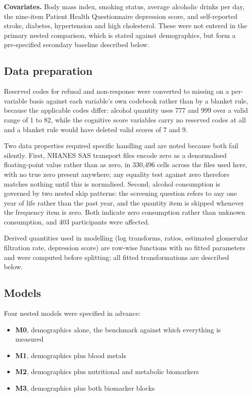 \documentclass[12pt]{article}
\begin{document}
\textbf{Covariates.} Body mass index, smoking status, average alcoholic drinks per day, the nine-item Patient Health Questionnaire depression score, and self-reported stroke, diabetes, hypertension and high cholesterol. These were not entered in the primary nested comparison, which is stated against demographics, but form a pre-specified secondary baseline described below.

\subsection*{Data preparation}

Reserved codes for refusal and non-response were converted to missing on a per-variable basis against each variable's own codebook rather than by a blanket rule, because the applicable codes differ: alcohol quantity uses 777 and 999 over a valid range of 1 to 82, while the cognitive score variables carry no reserved codes at all and a blanket rule would have deleted valid scores of 7 and 9.

Two data properties required specific handling and are noted because both fail silently. First, NHANES SAS transport files encode zero as a denormalised floating-point value rather than as zero, in 330,496 cells across the files used here, with no true zero present anywhere; any equality test against zero therefore matches nothing until this is normalised. Second, alcohol consumption is governed by two nested skip patterns: the screening question refers to any one year of life rather than the past year, and the quantity item is skipped whenever the frequency item is zero. Both indicate zero consumption rather than unknown consumption, and 403 participants were affected.

Derived quantities used in modelling (log transforms, ratios, estimated glomerular filtration rate, depression score) are row-wise functions with no fitted parameters and were computed before splitting; all fitted transformations are described below.

\subsection*{Models}

Four nested models were specified in advance:

\begin{itemize}
\item \textbf{M0}, demographics alone, the benchmark against which everything is measured
\item \textbf{M1}, demographics plus blood metals
\item \textbf{M2}, demographics plus nutritional and metabolic biomarkers
\item \textbf{M3}, demographics plus both biomarker blocks
\end{itemize}
\end{document}
